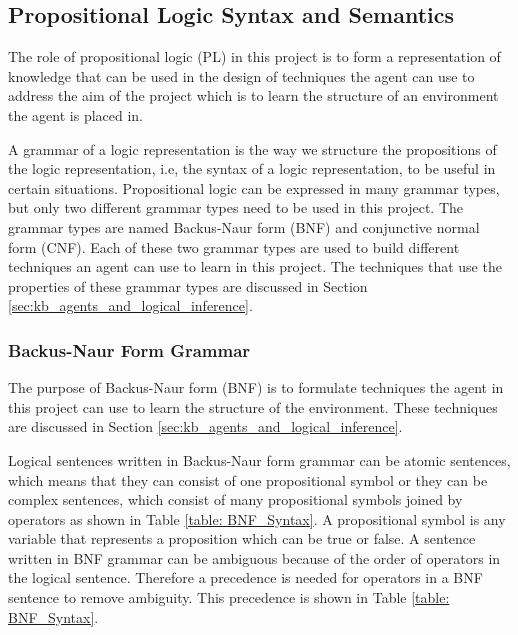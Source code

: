\subsection{Propositional Logic Syntax and Semantics}
\label{subsec: prop_logic}

The role of propositional logic (PL) in this project is to form a representation of knowledge that can be used in the design of techniques the agent can use to address the aim of the project  which is to learn the structure of an environment the agent is placed in.

A grammar of a logic representation is the way we structure the propositions of the logic representation, i.e, the syntax of a logic representation, to be useful in certain situations.
Propositional logic can be expressed in many grammar types, but only two different grammar types need to be used in this project.  The grammar types are named Backus-Naur form (BNF) and conjunctive normal form (CNF). Each of these two grammar types are used to build different techniques an agent can use to learn in this project. The techniques that use the properties of these grammar types are discussed in Section \ref{sec:kb_agents_and_logical_inference}.

\subsubsection{Backus-Naur Form Grammar}
\label{subsubsec:BNF}

The purpose of Backus-Naur form (BNF) is to formulate techniques the agent in this project can use to learn the structure of the environment. These techniques are  discussed in Section \ref{sec:kb_agents_and_logical_inference}.

Logical sentences written in Backus-Naur form grammar can be atomic sentences, which means that they can consist of one propositional symbol or they can be complex sentences, which consist of many propositional symbols joined by operators as shown in Table \ref{table: BNF_Syntax}. A propositional symbol is any variable that represents a proposition which can be true or false. A sentence written in BNF grammar can be ambiguous because of the order of operators in the logical sentence. Therefore a precedence is needed for operators in a BNF sentence to remove ambiguity. This precedence is shown in Table \ref{table: BNF_Syntax}. 

